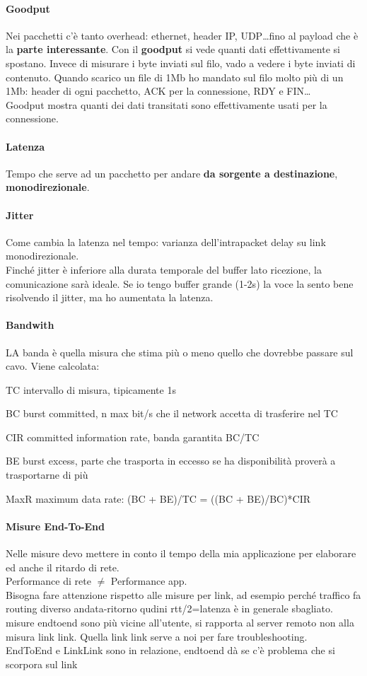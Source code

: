 \documentclass[10pt]{book}
\begin{document}
\paragraph{Goodput} Nei pacchetti c'è tanto overhead: ethernet, header IP, UDP\ldots fino al payload che è la \textbf{parte interessante}. Con il \textbf{goodput} si vede quanti dati effettivamente si spostano. Invece di misurare i byte inviati sul filo, vado a vedere i byte inviati di contenuto. Quando scarico un file di 1Mb ho mandato sul filo molto più di un 1Mb: header di ogni pacchetto, ACK per la connessione, RDY e FIN\ldots\\
Goodput mostra quanti dei dati transitati sono effettivamente usati per la connessione.
\paragraph{Latenza} Tempo che serve ad un pacchetto per andare \textbf{da sorgente a destinazione}, \textbf{monodirezionale}.
\paragraph{Jitter} Come cambia la latenza nel tempo: varianza dell'intrapacket delay su link monodirezionale.\\
Finché jitter è inferiore alla durata temporale del buffer lato ricezione, la comunicazione sarà ideale. Se io tengo buffer grande (1-2s) la voce la sento bene risolvendo il jitter, ma ho aumentata la latenza.
\paragraph{Bandwith} LA banda è quella misura che stima più o meno quello che dovrebbe passare sul cavo. Viene calcolata: 
\begin{list}{}{}
	\item TC intervallo di misura, tipicamente 1s
	\item BC burst committed, n max bit/s che il network accetta di trasferire nel TC
	\item CIR committed information rate, banda garantita BC/TC
	\item BE burst excess, parte che trasporta in eccesso se ha disponibilità proverà a trasportarne di più 
	\item MaxR maximum data rate: (BC + BE)/TC = ((BC + BE)/BC)*CIR
\end{list}
\paragraph{Misure End-To-End} Nelle misure devo mettere in conto il tempo della mia applicazione per elaborare ed anche il ritardo di rete.\\
Performance di rete $\neq$ Performance app.\\
Bisogna fare attenzione rispetto alle misure per link, ad esempio perché traffico fa routing diverso andata-ritorno qudini rtt/2=latenza è in generale sbagliato. misure endtoend sono più vicine all'utente, si rapporta al server remoto non alla misura link link. Quella link link serve a noi per fare troubleshooting.\\
EndToEnd e LinkLink sono in relazione, endtoend dà se c'è problema che si scorpora sul link
\end{document}
